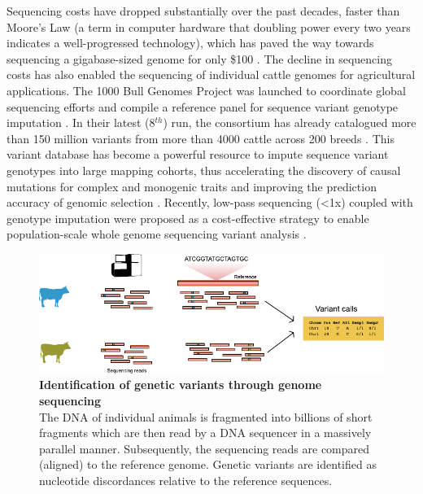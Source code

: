 \documentclass[../main.tex]{subfiles}
\begin{document}
Sequencing costs have dropped substantially over the past decades, faster than Moore’s Law (a term in computer hardware that doubling power every two years indicates a well-progressed technology), which has paved the way towards sequencing a gigabase-sized genome for only \$100 \citep{Regalado2020,Wetterstrand2020}. The decline in sequencing costs has also enabled the sequencing of individual cattle genomes for agricultural applications. The 1000 Bull Genomes Project was launched to coordinate global sequencing efforts and compile a reference panel for sequence variant genotype imputation \citep{daetwyler2014whole}. In their latest  (8$^{th}$) run, the consortium has already catalogued more than 150 million variants from more than 4000 cattle across 200 breeds \citep{hayes20191000}. This variant database has become a powerful resource to impute sequence variant genotypes into large mapping cohorts, thus accelerating the discovery of causal mutations for complex and monogenic traits and improving the prediction accuracy of genomic selection \citep{daetwyler2014whole}. Recently, low-pass sequencing (<1x) coupled with genotype imputation were proposed as a cost-effective strategy to enable population-scale whole genome sequencing variant analysis \citep{snelling2020assessment}. \\

\bigskip

\begin{figure}[!htb]
    \centering
    \includegraphics[width=\textwidth]{intro/fig1.pdf}
        \vspace{3mm}
        \caption[Identification of genetic variants through genome sequencing]{\textbf{Identification of genetic variants through genome sequencing} \\
        \footnotesize{The DNA of individual animals is fragmented into billions of short fragments which are then read by a DNA sequencer in a massively parallel manner. Subsequently, the sequencing reads are compared (aligned) to the reference genome. Genetic variants are identified as nucleotide discordances relative to the reference sequences.}}
        \label{fig11:reseq}
\end{figure}
\end{document}
